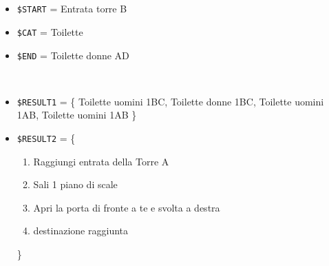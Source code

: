 \documentclass[../../SperimentazioniPratiche.tex]{subfiles}
\begin{document}
			\paragraph*{}
			\label{2Prova1B.2}
			\begin{tcolorbox}[fonttitle=\bfseries, 
								adjusted title={\Large Prova 1B.2}, 
								breakable, 
								sharp corners=south,
								colback=white, 
								colframe=white!60!black]
								
				\begin{description}[leftmargin=0.7cm,labelwidth=!]
				
					\item[Input] \ \par 
        				\begin{itemize}
        					\item \verb|$START| = Entrata torre B
							\item \verb|$CAT| = Toilette
							\item \verb|$END| = Toilette donne AD
        				\end{itemize}
        				
        			\tcbline 
        				
        			\item[Output atteso] \ \par
        				\begin{itemize}

							\item \verb|$RESULT1| = \{
								Toilette uomini 1BC, Toilette donne 1BC, Toilette uomini 1AB, Toilette uomini 1AB
							\}        				
        				
        					\item \verb|$RESULT2| = \{
        					\begin{enumerate}
        						\item Raggiungi entrata della Torre A
								\item Sali 1 piano di scale
								\item Apri la porta di fronte a te e svolta a destra
								\item destinazione raggiunta
        					\end{enumerate}
        					\}
        				\end{itemize}

					\tcbline        				
        				
        			\item[Output riscontrato] \ \par
        				\begin{description}
        				

\end{description}
\end{description}
\end{tcolorbox}
\end{document}
